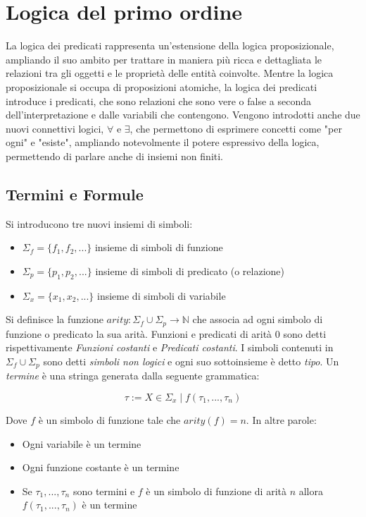 \documentclass[./main.tex]{subfiles}
\begin{document}

\section{Logica del primo ordine}

La logica dei predicati rappresenta un'estensione della logica proposizionale, 
ampliando il suo ambito per trattare in maniera più ricca e dettagliata le relazioni tra gli oggetti 
e le proprietà delle entità coinvolte. Mentre la logica proposizionale si occupa di proposizioni atomiche, 
la logica dei predicati introduce i predicati,
che sono relazioni che sono vere o false a seconda dell'interpretazione e dalle variabili che contengono.
Vengono introdotti anche due nuovi connettivi logici, $\forall$ e $\exists$, che permettono 
di esprimere concetti come "per ogni" e "esiste", ampliando notevolmente il potere espressivo della logica,
permettendo di parlare anche di insiemi non finiti.

\subsection{Termini e Formule} \label{sec:sintassi_fof}
Si introducono tre nuovi insiemi di simboli:
\begin{itemize}
  \item $\Sigma_f = \{f_1, f_2, ...\}$ insieme di simboli di funzione
  \item $\Sigma_p = \{p_1, p_2, ...\}$ insieme di simboli di predicato (o relazione)
  \item $\Sigma_x = \{x_1, x_2, ...\}$ insieme di simboli di variabile
\end{itemize}

Si definisce la funzione $arity : \Sigma_f \cup \Sigma_p \rightarrow \mathbb{N}$ che associa ad ogni simbolo di funzione o predicato la sua arità.
Funzioni e predicati di arità 0 sono detti rispettivamente \textit{Funzioni costanti} e \textit{Predicati costanti}.
I simboli contenuti in $\Sigma_f \cup \Sigma_p$ sono detti \textit{simboli non logici} e ogni suo sottoinsieme è detto \textit{tipo}.
Un \textit{termine} è una stringa generata dalla seguente grammatica:

$$ \tau := X \in \Sigma_x \mid f(\tau_1, ..., \tau_n) $$

Dove $f$ è un simbolo di funzione tale che $arity(f) = n$. In altre parole:
\begin{itemize}
  \item Ogni variabile è un termine
  \item Ogni funzione costante è un termine
  \item Se $\tau_1, ..., \tau_n$ sono termini e $f$ è un simbolo di funzione di arità $n$ allora $f(\tau_1, ..., \tau_n)$ è un termine
\end{itemize}
\end{document}

